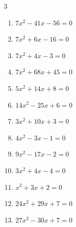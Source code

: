 \begin{multicols}{3}
\begin{enumerate}

  \item $7x^{2}-41x-56=0$


  \item $7x^{2}+6x-16=0$


  \item $7x^{2}+4x-3=0$


  \item $7x^{2}+68x+45=0$


  \item $5x^{2}+14x+8=0$


\columnbreak %

  \item $14x^{2}-25x+6=0$


  \item $3x^{2}+10x+3=0$


  \item $4x^{2}-3x-1=0$


  \item $9x^{2}-17x-2=0$


  \item $3x^{2}+4x-4=0$


  \item $x^{2}+3x+2=0$

        \phantom{$\displaystyle x=-1,\; -2$}

  \item $24x^{2}+29x+7=0$


  \item $27x^{2}-30x+7=0$


\end{enumerate}
\end{multicols}
